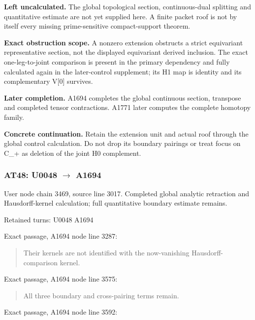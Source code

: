 \textbf{Left uncalculated.} The global topological section,
continuous-dual splitting and quantitative estimate are not yet supplied
here. A finite packet roof is not by itself every missing
prime-sensitive compact-support theorem.

\textbf{Exact obstruction scope.} A nonzero extension obstructs a strict
equivariant representative section, not the displayed equivariant
derived inclusion. The exact one-leg-to-joint comparison is present in
the primary dependency and fully calculated again in the later-control
supplement; its H1 map is identity and its complementary V{[}0{]}
survives.

\textbf{Later completion.} A1694 completes the global continuous
section, transpose and completed tensor contractions. A1771 later
computes the complete homotopy family.

\textbf{Concrete continuation.} Retain the extension unit and actual
roof through the global control calculation. Do not drop its boundary
pairings or treat focus on C\_+ as deletion of the joint H0 complement.

\subsubsection{\texorpdfstring{AT48: U0048
\allowbreak{}\ensuremath{→}\allowbreak{}
A1694}{AT48: U0048  A1694}}\label{at48-u0048-a1694}

User node \protect{} chain
3469, source line 3017. Completed global analytic retraction and
Hausdorff-kernel calculation; full quantitative boundary estimate
remains.

Retained turns: U0048
\protect{} A1694
\protect{}

Exact passage, A1694 node
\protect{} line 3287:

\begin{quote}
Their kernels are not identified with the now-vanishing
Hausdorff-comparison kernel.
\end{quote}

Exact passage, A1694 node
\protect{} line 3575:

\begin{quote}
All three boundary and cross-pairing terms remain.
\end{quote}

Exact passage, A1694 node
\protect{} line 3592:

